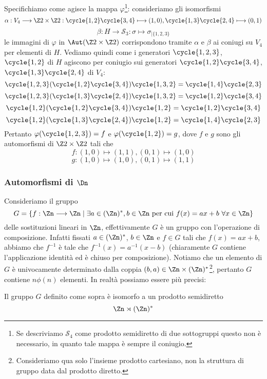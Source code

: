 \documentclass[11pt]{scrartcl}
\begin{document}
	Specifichiamo come agisce la mappa $\varphi$\footnote{Se descriviamo $\mathcal{S}_4$ 
		come prodotto semidiretto di due sottogruppi questo non è 
		necessario, in quanto tale mappa è sempre il coniugio.
	}:
	consideriamo gli isomorfismi
	\[
	\alpha: V_4\longrightarrow \Z2\times\Z2: \cycle{1, 2}\cycle{3, 4}\longmapsto (1, 0),
	\cycle{1, 3}\cycle{2, 4} \longmapsto (0, 1)
	\]
	\[
	\beta: H \longrightarrow \mathcal{S}_3: \sigma \longmapsto \sigma_{\mid\{1, 2, 3\}}
	\]
	le immagini di $\varphi$ in $\Aut(\Z2\times\Z2)$ corrispondono tramite $\alpha$
	e $\beta$ ai coniugi su $V_4$ per elementi di $H$. Vediamo quindi come
	i generatori $\cycle{1, 2, 3}$, $\cycle{1, 2}$ di $H$ agiscono per coniugio
	sui generatori $\cycle{1, 2}\cycle{3, 4}$, $\cycle{1, 3}\cycle{2, 4}$ di $V_4$:
	\[
	\cycle{1, 2, 3}(\cycle{1, 2}\cycle{3, 4})\cycle{1, 3, 2} = \cycle{1, 4}\cycle{2, 3}
	\]
	\[
	\cycle{1, 2, 3}(\cycle{1, 3}\cycle{2, 4})\cycle{1, 3, 2} = \cycle{1, 2}\cycle{3, 4}
	\]
	\[
	\cycle{1, 2}(\cycle{1, 2}\cycle{3, 4})\cycle{1, 2} = \cycle{1, 2}\cycle{3, 4}
	\]
	\[
	\cycle{1, 2}(\cycle{1, 3}\cycle{2, 4})\cycle{1, 2} = \cycle{1, 4}\cycle{2, 3}
	\]
	Pertanto $\varphi(\cycle{1, 2, 3}) = f$ e $\varphi(\cycle{1, 2}) = g$,
	dove $f$ e $g$ sono gli automorfismi di $\Z2\times\Z2$ tali che
	\[
	f: (1, 0)\longmapsto (1, 1), (0, 1) \longmapsto (1, 0)
	\]
	\[
	g: (1, 0)\longmapsto (1, 0), (0, 1) \longmapsto (1, 1)
	\]
	
	\subsubsection{Automorfismi di \texorpdfstring{$\Dn$}{Dₙ}}
	
	Consideriamo il gruppo 
	\[
	G = \{f: \Zn\longrightarrow\Zn\mid \exists a \in (\Zn)^*, b \in \Zn\text{ per cui }
	f(x) = ax + b~\forall x \in \Zn\}
	\]
	delle sostituzioni lineari in $\Zn$, effettivamente $G$ è un gruppo con 
	l'operazione di composizione. Infatti fissati $a \in (\Zn)^*$, $b \in \Zn$ e
	$f \in G$ tali che $f(x) = ax + b$, abbiamo che $f^{-1}$ è tale che 
	$f^{-1}(x) = a^{-1}(x - b)$ (chiaramente $G$ contiene l'applicazione identità 
	ed è chiuso per composizione). Notiamo che un elemento di $G$ è univocamente
	determinato dalla coppia $(b, a) \in \Zn \times (\Zn)^*$\footnote{
		Consideriamo qua solo l'insieme prodotto cartesiano, non la struttura di 
		gruppo data dal prodotto diretto.
	}, pertanto $G$
	contiene $n\phi(n)$ elementi. In realtà possiamo essere più precisi:
	
	\begin{proposition}
		Il gruppo $G$ definito come sopra è isomorfo a un prodotto semidiretto 
		\[
		\Zn \rtimes (\Zn)^*
		\]
	\end{proposition}
	
\end{document}
